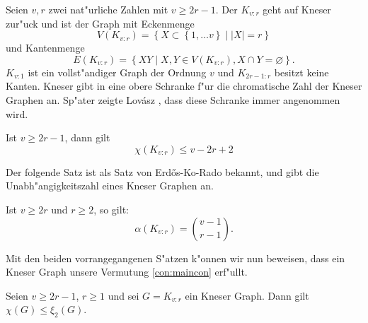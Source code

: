 Seien $v,r$ zwei nat"urliche Zahlen mit $v\geq 2r-1$. Der  $K_{v:r}$ geht auf Kneser \cite{Kneser55} zur"uck und ist der Graph mit Eckenmenge $$V(K_{v:r}) = \left\{ X \subset \left\{ 1,\dots v \right\} \;|\; |X| = r \right\}$$ und Kantenmenge 
 $$E(K_{v:r}) = \left\{ XY\;|\; X,Y \in V(K_{v:r}), X \cap Y = \varnothing \right\}.$$ 
 $K_{v:1}$ ist ein vollst"andiger Graph der Ordnung $v$ und $K_{2r-1:r}$ besitzt keine Kanten. Kneser gibt in \cite{Kneser55} eine obere Schranke f"ur die chromatische Zahl der Kneser Graphen an. Sp"ater zeigte Lov\'asz , dass diese Schranke immer angenommen wird.
 \begin{theorem}
   Ist $v\geq 2r-1$, dann gilt
   $$\chi(K_{v:r}) \leq v-2r+2$$ \label{thm:kneserfarbung}
 \end{theorem}
 Der folgende Satz ist als Satz von Erd\H{o}s-Ko-Rado \cite{ErdosKoRado61} bekannt, und gibt die Unabh"angigkeitszahl eines Kneser Graphen an.
 \begin{theorem}
   Ist $v\geq 2r$ und $r \geq 2$, so gilt: 
   $$\alpha(K_{v:r})= \binom{v-1}{r-1}.$$
   \label{thm:ErdosKoRado}
 \end{theorem}
 Mit den beiden vorrangegangenen S"atzen k"onnen wir nun beweisen, dass ein Kneser Graph unsere Vermutung \ref{con:maincon} erf"ullt. 
\begin{proposition}
  Seien $v\geq 2r-1$, $r\geq 1$ und sei $G= K_{v:r}$ ein Kneser Graph. Dann gilt $\chi(G) \leq \xi_{2}(G)$. 
\end{proposition}

